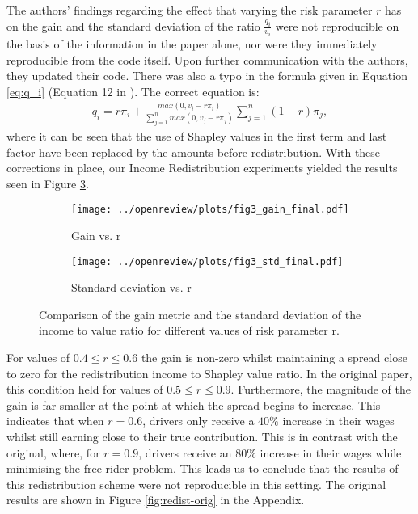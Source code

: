 The authors' findings regarding the effect that varying the risk parameter $r$ has on the gain and the standard deviation of the ratio $\frac{q_{i}}{v_{i}}$ were not reproducible on the basis of the information in the paper alone, nor were they immediately reproducible from the code itself. Upon further communication with the authors, they updated their code. There was also a typo in the formula given in Equation \ref{eq:q_i} (Equation 12 in \citet{raman21}). The correct equation is:
\begin{align}
    q_{i} = r\pi_{i} +  \frac{max(0, v_{i}-r\pi_{i})}{\sum_{j=1}^{n}max(0, v_{j}-r\pi_{j})}\sum_{j=1}^{n}(1-r)\pi_{j},
\end{align}
where it can be seen that the use of Shapley values in the first term and last factor have been replaced by the amounts before redistribution. With these corrections in place, our Income Redistribution experiments yielded the results seen in Figure \ref{fig:redist}.
\begin{figure}
    \centering
    \begin{subfigure}{0.5\textwidth}
      \centering
      \texttt{[image: ../openreview/plots/fig3\_gain\_final.pdf]}
      \caption{Gain vs. r}
      \label{fig:redist_gain}
    \end{subfigure}%
    \begin{subfigure}{0.5\textwidth}
      \centering
      \texttt{[image: ../openreview/plots/fig3\_std\_final.pdf]}
      \caption{Standard deviation vs. r}
      \label{fig:redist_std}
    \end{subfigure}
    \caption{Comparison of the gain metric and the standard deviation of the income to value ratio for different values of risk parameter r. }
    \label{fig:redist}
\end{figure}
For values of $0.4 \leq r \leq 0.6$ the gain is non-zero whilst maintaining a spread close to zero for the redistribution income to Shapley value ratio. In the original paper, this condition held for values of $0.5 \leq r \leq 0.9$.  Furthermore, the magnitude of the gain is far smaller at the point at which the spread begins to increase. This indicates that when $r=0.6$, drivers only receive a $40\%$ increase in their wages whilst still earning close to their true contribution. This is in contrast with the original, where, for $r=0.9$, drivers receive an $80\%$ increase in their wages while minimising the free-rider problem. This leads us to conclude that the results of this redistribution scheme were not reproducible in this setting. The original results are shown in Figure \ref{fig:redist-orig} in the Appendix.

